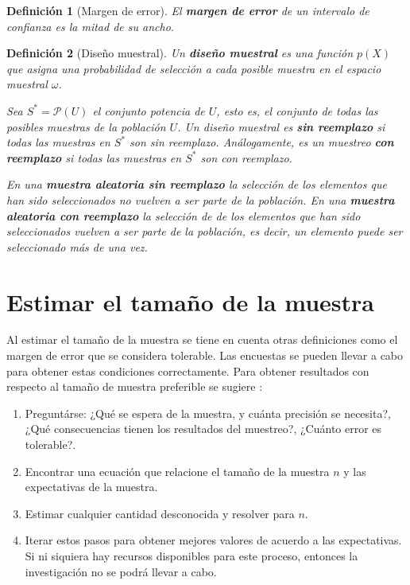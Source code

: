 \documentclass{report}
\newtheorem{definition}{Definición}
\begin{document}
\begin{definition}[Margen de error]
    El \textbf{margen de error} de un intervalo de confianza es la mitad de su ancho.
\end{definition}

\begin{definition}[Diseño muestral]
    Un \textbf{diseño muestral} es una función $p(X)$ que asigna una probabilidad de selección a cada posible muestra en el espacio muestral $\omega$.
    
    \bigbreak
    
    Sea $S^* = \mathcal{P}(U)$ el conjunto potencia de $U$, esto es, el conjunto de todas las posibles muestras de la población $U$. Un diseño muestral es \textbf{sin reemplazo} si todas las muestras en $S^*$ son sin reemplazo. Análogamente, es un muestreo \textbf{con reemplazo} si todas las muestras en $S^*$ son con reemplazo.

    \bigbreak
    
    En una \textbf{muestra aleatoria sin reemplazo} la selección de los elementos que han sido seleccionados no vuelven a ser parte de la población. En una \textbf{muestra aleatoria con reemplazo} la selección de de los elementos que han sido seleccionados vuelven a ser parte de la población, es decir, un elemento puede ser seleccionado más de una vez.
\end{definition}

\section{Estimar el tamaño de la muestra}

Al estimar el tamaño de la muestra se tiene en cuenta otras definiciones como el margen de error que se considera tolerable. Las encuestas se pueden llevar a cabo para obtener estas condiciones correctamente. Para obtener resultados con respecto al tamaño de muestra preferible se sugiere \cite{lohr-2009}:

\begin{enumerate}
    \item Preguntárse: ¿Qué se espera de la muestra, y cuánta precisión se necesita?, ¿Qué consecuencias tienen los resultados del muestreo?, ¿Cuánto error es tolerable?.
    
    \item Encontrar una ecuación que relacione el tamaño de la muestra $n$ y las expectativas de la muestra.
    
    \item Estimar cualquier cantidad desconocida y resolver para $n$.
    
    \item Iterar estos pasos para obtener mejores valores de acuerdo a las expectativas. Si ni siquiera hay recursos disponibles para este proceso, entonces la investigación no se podrá llevar a cabo.
\end{enumerate}
\end{document}
